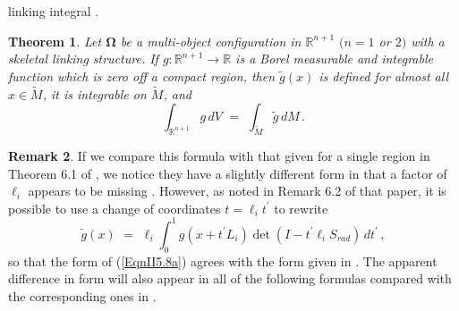 \documentclass[10pt]{amsart}
\newtheorem{Thm}{Theorem}[section] \newtheorem{TitleThm}[Thm]{}
\theoremstyle{definition}
\theoremstyle{definition}
\newtheorem{Remark}[Thm]{Remark}
\numberwithin{equation}{section}
\newcommand{\R}{{\mathbb R}}
\def \bgW {\boldsymbol \Omega}
\begin{document}
linking integral \cite[Thm 10.6]{DG}. 
\begin{Thm}
\label{ThmII5.5}
Let $\bgW$ be a multi-object configuration in $\R^{n+1}$ $(n=1$ or $2)$ 
with a skeletal linking structure.  If $g : \R^{n+1} \to \R$ is a Borel 
measurable and 
integrable function which is zero off a compact region, then $\tilde g(x)$ 
is defined for almost all $x \in \tilde M$, it is integrable on $\tilde M$, 
and 
\begin{equation}
\label{EqnII5.7}
\int_{\R^{n+1}} g\, dV \,\, = \,\, \int_{\tilde M} \tilde g \, dM\, .
\end{equation} 
\end{Thm}
\par
\begin{Remark}
\label{RemII5.8}
\normalfont
If we compare this formula with that given for a single region in Theorem 
6.1 of \cite{D4}, we notice they have a slightly different 
form in that a factor of $\ell_i$ appears to be missing .  However, as 
noted in Remark 6.2 of that paper, it is possible to use a change of 
coordinates $t = \ell_i t^{\prime}$ to rewrite 
\begin{equation}
\label{EqnII5.8a}
\tilde g(x) \,\, = \,\, \ell_i \int_{0}^{1} g (x + t^{\prime} L_i) \det(I - 
t^{\prime} \ell_i S_{rad})\, dt^{\prime}\, , 
\end{equation}
so that the form of (\ref{EqnII5.8a}) agrees with the form given in 
\cite{D4}.  The apparent difference in form will also appear in all of the 
following formulas compared with the corresponding ones in \cite{D4}.
\end{Remark}
\par
\end{document}
